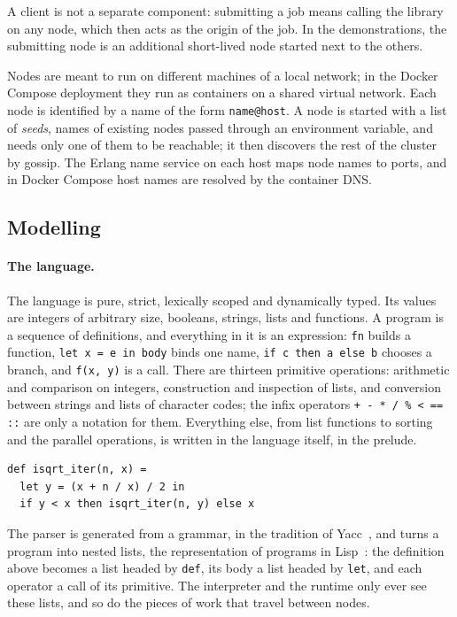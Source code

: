 \documentclass{scrartcl}
\begin{document}
A client is not a separate component: submitting a job means calling the library on any node, which then acts as the origin of the job.
%
In the demonstrations, the submitting node is an additional short-lived node started next to the others.

Nodes are meant to run on different machines of a local network; in the Docker Compose deployment they run as containers on a shared virtual network.
%
Each node is identified by a name of the form \texttt{name@host}.
%
A node is started with a list of \emph{seeds}, names of existing nodes passed through an environment variable, and needs only one of them to be reachable; it then discovers the rest of the cluster by gossip.
%
The Erlang name service on each host maps node names to ports, and in Docker Compose host names are resolved by the container DNS.

\subsection{Modelling}\label{modelling}

\paragraph{The language.}
The language is pure, strict, lexically scoped and dynamically typed.
%
Its values are integers of arbitrary size, booleans, strings, lists and functions.
%
A program is a sequence of definitions, and everything in it is an expression: \texttt{fn} builds a function, \texttt{let x = e in body} binds one name, \texttt{if c then a else b} chooses a branch, and \texttt{f(x, y)} is a call.
%
There are thirteen primitive operations: arithmetic and comparison on integers, construction and inspection of lists, and conversion between strings and lists of character codes; the infix operators \texttt{+ - * / \% < == ::} are only a notation for them.
%
Everything else, from list functions to sorting and the parallel operations, is written in the language itself, in the prelude.
\begin{lstlisting}
def isqrt_iter(n, x) =
  let y = (x + n / x) / 2 in
  if y < x then isqrt_iter(n, y) else x
\end{lstlisting}
%
The parser is generated from a grammar, in the tradition of Yacc~\cite{johnson1975yacc}, and turns a program into nested lists, the representation of programs in Lisp~\cite{mccarthy1960recursive}: the definition above becomes a list headed by \texttt{def}, its body a list headed by \texttt{let}, and each operator a call of its primitive.
%
The interpreter and the runtime only ever see these lists, and so do the pieces of work that travel between nodes.
\end{document}
